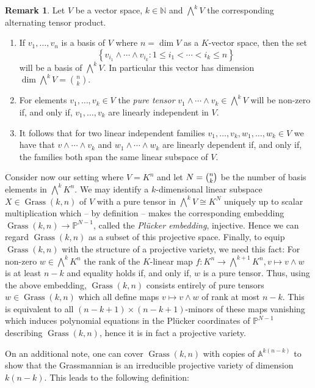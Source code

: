\documentclass[
  paper=a4,
  titlepage,
  bibliography=totoc,
  pagesize=pdftex
]{scrartcl}
\numberwithin{figure}{section}
\numberwithin{equation}{section}
\numberwithin{table}{section}
\newcommand*\setN{\mathds{N}}
\newcommand*\setA{\mathds{A}}
\newcommand*\setP{\mathds{P}}
\DeclareMathOperator{\Grass}{Grass}
\theoremstyle{definition}
\newtheorem{remark}[definition]{Remark}
\numberwithin{definition}{section}
\begin{document}
\begin{remark}
  Let $V$ be a vector space, $k \in \setN$ and $\bigwedge^k V$ the corresponding
  alternating tensor product.
  \begin{enumerate}
    \item If $v_1, \dots, v_n$ is a basis of $V$ where $n=\dim V$ as a $K$-vector space,
      then the set
      \[
        \left\{
          v_{i_1} \wedge \cdots \wedge v_{i_k} : 1\leq i_1 < \cdots < i_k \leq n
        \right\}
      \]
      will be a basis of $\bigwedge^kV$. In particular this vector has dimension
      $\dim\bigwedge^kV = \binom nk$.
    \item For elements $v_1, \dots, v_k \in V$ the \emph{pure tensor} $v_1\wedge \cdots
      \wedge v_k \in \bigwedge^kV$ will be non-zero if, and only if, $v_1, \dots, v_k$ are
      linearly independent in $V$.
    \item It follows that for two linear independent families $v_1, \dots, v_k, w_1,
      \dots, w_k \in V$ we have that $v\wedge\cdots \wedge v_k$ and $w_1\wedge\cdots\wedge
      w_k$ are linearly dependent if, and only if, the families both span the same linear
      subspace of $V$.
  \end{enumerate}
\end{remark}

Consider now our setting where $V=K^n$ and let $N = \smash{\binom nk}$ be the number of
basis elements in $\bigwedge^kK^n$. We may identify a $k$-dimensional linear subspace $X
\in \Grass(k,n)$ of $V$ with a pure tensor in $\bigwedge^kV \cong K^N$ uniquely up to
scalar multiplication which -- by definition -- makes the corresponding embedding
$\Grass(k,n) \to \setP^{N-1}$, called the \emph{Plücker embedding}, injective. Hence we
can regard $\Grass(k,n)$ as a subset of this projective space. Finally, to equip
$\Grass(k,n)$ with the structure of a projective variety, we need this fact: For non-zero
$w\in \bigwedge^kK^n$ the rank of the $K$-linear map $f:K^n \to \bigwedge^{k+1}K^n, v
\mapsto v \wedge w$ is at least $n-k$ and equality holds if, and only if, $w$ is a pure
tensor. Thus, using the above embedding, $\Grass(k,n)$ consists entirely of pure tensors
$w\in \Grass(k,n)$ which all define maps $v\mapsto v\wedge w$ of rank at most $n-k$. This
is equivalent to all $(n-k+1) \times (n-k+1)$-minors of these maps vanishing which induces
polynomial equations in the Plücker coordinates of $\setP^{N-1}$ describing $\Grass(k,n)$,
hence it is in fact a projective variety.

On an additional note, one can cover $\Grass(k,n)$ with copies of $\setA^{k(n-k)}$ to show
that the Grassmannian is an irreducible projective variety of dimension $k(n-k)$. This
leads to the following definition:
\end{document}
